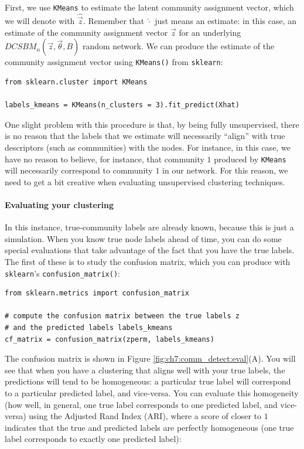 First, we use \texttt{KMeans} to estimate the latent community assignment vector, which we will denote with $\hat{\vec z}$. Remember that $\hat\cdot$ just means an estimate: in this case, an estimate of the community assignment vector $\vec z$ for an underlying $DCSBM_n(\vec z, \vec \theta, B)$ random network. We can produce the estimate of the community assignment vector using \texttt{KMeans()} from \texttt{sklearn}:

\begin{lstlisting}[style=python]
from sklearn.cluster import KMeans

labels_kmeans = KMeans(n_clusters = 3).fit_predict(Xhat)
\end{lstlisting}

One slight problem with this procedure is that, by being fully unsupervised, there is no reason that the labels that we estimate will necessarily ``align'' with true descriptors (such as communities) with the nodes. For instance, in this case, we have no reason to believe, for instance, that community $1$ produced by \texttt{KMeans} will necessarily correspond to community $1$ in our network. For this reason, we need to get a bit creative when evaluating unsupervised clustering techniques.

\paragraph{Evaluating your clustering}
\label{ch7:comm_detect:eval}

In this instance, true-community labels are already known, because this is just a simulation. When you know true node labels ahead of time, you can do some special evaluations that take advantage of the fact that you have the true labels. The first of these is to study the confusion matrix, which you can produce with \texttt{sklearn}'s \texttt{confusion\_matrix()}:

\begin{lstlisting}[style=python]
from sklearn.metrics import confusion_matrix

# compute the confusion matrix between the true labels z
# and the predicted labels labels_kmeans
cf_matrix = confusion_matrix(zperm, labels_kmeans)
\end{lstlisting}

The confusion matrix is shown in Figure \ref{fig:ch7:comm_detect:eval}(A). You will see that when you have a clustering that aligns well with your true labels, the predictions will tend to be homogeneous: a particular true label will correspond to a particular predicted label, and vice-versa. You can evaluate this homogeneity (how well, in general, one true label corresponds to one predicted label, and vice-versa) using the Adjusted Rand Index (ARI), where a score of closer to $1$ indicates that the true and predicted labels are perfectly homogeneous (one true label corresponds to exactly one predicted label):

